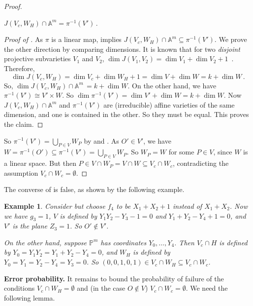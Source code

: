 \documentclass{toc}
\newtheorem{exmp}{Example}
\newcommand{\aff}{\mathbb{A}}
\newcommand{\proj}{\mathbb{P}}
\begin{document}
\begin{proof}
\begin{claim}\label{claim_join2}
  $J(V_c,W_H)\cap \aff^m=\pi^{-1}(V')$\,.
  \end{claim} 
 \begin{proof}[Proof of ]
  As $\pi$ is a linear map,   implies $J(V_c,W_H)\cap \aff^m\subseteq\pi^{-1}(V')$. We prove the other direction by comparing dimensions.
It is known that for two \emph{disjoint} projective subvarieties $V_1$ and $V_2$,  $\dim J(V_1,V_2)=\dim V_1+\dim V_2+1$~\cite[Proposition~11.37 and Exercise~11.38]{Har92}. Therefore,
\[
\dim J(V_c, W_H)=\dim V_c +\dim W_H+1=\dim V+\dim W=k+\dim W \,.
\]
So, $\dim J(V_c,W_H) \cap \aff^m \,= k+\dim W$.
On the other hand, we have $\pi^{-1}(V')\cong V'\times W$. So $\dim \pi^{-1}(V')=\dim V'+\dim W=k+\dim W$. Now $J(V_c,W_H)\cap \aff^m$ and $\pi^{-1}(V')$ are (irreducible) affine varieties of the same dimension, and one is contained in the other. So they must be equal. This proves the claim.
\end{proof}

So  $\pi^{-1}(V')=\bigcup_{P\in V} W_P$ by  and .
As $O'\in V'$, we have $W=\pi^{-1}(O')\subseteq \pi^{-1}(V')=\bigcup_{P\in V} W_P$. So $W_P=W$ for some $P\in V$, since $W$ is a linear space. But then $P\in V\cap W_P=V\cap W\subseteq V_c\cap W_c$, contradicting the assumption $V_c\cap W_c=\emptyset$.
 \end{proof}
\noindent
%
\begin{remark}   %
The converse of  is false, as shown by the following example.  %

\begin{exmp}\label{exmp-projcrit}
Consider  but choose $f_4$ to be $X_1+X_2+1$ instead of $X_1+X_2$. Now we have $g_3=1$, $V$ is defined by $Y_1Y_2-Y_3-1=0$ and $Y_1+Y_2-Y_4+1=0$, and $V'$ is the plane $Z_3=1$. So $O'\not\in V'$. 

On the other hand, suppose $\proj^m$ has coordinates $Y_0,\dots,Y_4$. Then $V_c\cap H$ is defined by $Y_0=Y_1Y_2=Y_1+Y_2-Y_4=0$, and $W_H$ is defined by $Y_0=Y_1=Y_2-Y_4=Y_3=0$. So $(0,0,1,0,1)\in V_c\cap W_H\subseteq V_c\cap W_c$.
\end{exmp}
\end{remark}

\smallskip\noindent
\textbf{Error probability.} It remains to bound the probability of failure of the conditions $V_c\cap W_H=\emptyset$ and (in the case $O\not\in V$) $V_c\cap W_c=\emptyset$. We need the following lemma.
\end{document}
